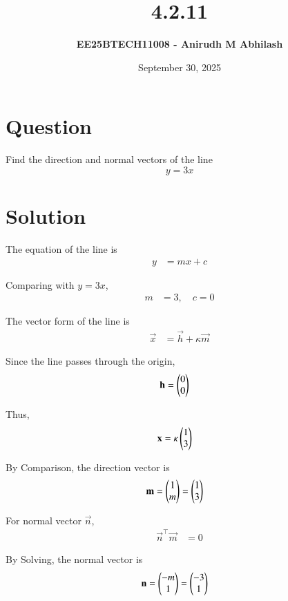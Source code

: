 \documentclass[12pt]{article}
\title{\textbf{4.2.11}}
\author{\textbf{EE25BTECH11008 - Anirudh M Abhilash}}
\date{September 30, 2025}
\begin{document}
\maketitle

\section*{Question}

Find the direction and normal vectors of the line
\[
y = 3x
\]

\section*{Solution}

The equation of the line is
\begin{align}
y &= mx + c \label{eq:genline}
\end{align}

Comparing with $y = 3x$,  
\begin{align}
m &= 3, \quad c = 0
\end{align}

The vector form of the line is
\begin{align}
\vec{x} &= \vec{h} + \kappa \vec{m} \label{eq:vectorform}
\end{align}

Since the line passes through the origin,
\begin{align}
\mathbf{h} &= \begin{pmatrix}0 \\ 0\end{pmatrix}
\end{align}

Thus,
\begin{align}
\mathbf{x} &= \kappa \begin{pmatrix}1 \\ 3\end{pmatrix}
\end{align}

By Comparison, the direction vector is
\begin{align}
\mathbf{m} &= \begin{pmatrix}1 \\ m\end{pmatrix} = \begin{pmatrix}1 \\ 3\end{pmatrix}
\end{align}

For normal vector $\vec{n}$, 
\begin{align}
\vec{n}^\top \vec{m} &= 0
\end{align}

By Solving, the normal vector is
\begin{align}
\mathbf{n} &= \begin{pmatrix}-m \\ 1\end{pmatrix} = \begin{pmatrix}-3 \\ 1\end{pmatrix}
\end{align}
\end{document}
